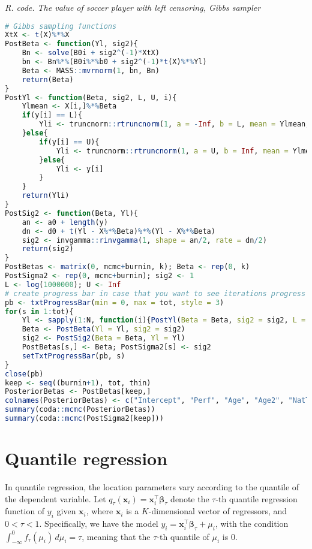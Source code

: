 \begin{tcolorbox}[enhanced,width=4.67in,center upper,
	fontupper=\large\bfseries,drop shadow southwest,sharp corners]
	\textit{R. code. The value of soccer player with left censoring, Gibbs sampler}
	\begin{VF}
		\begin{lstlisting}[language=R]
# Gibbs sampling functions
XtX <- t(X)%*%X
PostBeta <- function(Yl, sig2){
	Bn <- solve(B0i + sig2^(-1)*XtX)
	bn <- Bn%*%(B0i%*%b0 + sig2^(-1)*t(X)%*%Yl)
	Beta <- MASS::mvrnorm(1, bn, Bn)
	return(Beta)
}
PostYl <- function(Beta, sig2, L, U, i){
	Ylmean <- X[i,]%*%Beta
	if(y[i] == L){
		Yli <- truncnorm::rtruncnorm(1, a = -Inf, b = L, mean = Ylmean, sd = sig2^0.5)
	}else{
		if(y[i] == U){
			Yli <- truncnorm::rtruncnorm(1, a = U, b = Inf, mean = Ylmean, sd = sig2^0.5)
		}else{
			Yli <- y[i]
		}
	}
	return(Yli)
}
PostSig2 <- function(Beta, Yl){
	an <- a0 + length(y)
	dn <- d0 + t(Yl - X%*%Beta)%*%(Yl - X%*%Beta)
	sig2 <- invgamma::rinvgamma(1, shape = an/2, rate = dn/2)
	return(sig2)
}
PostBetas <- matrix(0, mcmc+burnin, k); Beta <- rep(0, k)
PostSigma2 <- rep(0, mcmc+burnin); sig2 <- 1
L <- log(1000000); U <- Inf
# create progress bar in case that you want to see iterations progress
pb <- txtProgressBar(min = 0, max = tot, style = 3)
for(s in 1:tot){
	Yl <- sapply(1:N, function(i){PostYl(Beta = Beta, sig2 = sig2, L = L, U = U, i)})
	Beta <- PostBeta(Yl = Yl, sig2 = sig2)
	sig2 <- PostSig2(Beta = Beta, Yl = Yl) 
	PostBetas[s,] <- Beta; PostSigma2[s] <- sig2
	setTxtProgressBar(pb, s)
}
close(pb)
keep <- seq((burnin+1), tot, thin)
PosteriorBetas <- PostBetas[keep,]
colnames(PosteriorBetas) <- c("Intercept", "Perf", "Age", "Age2", "NatTeam", "Goals", "Exp", "Exp2")
summary(coda::mcmc(PosteriorBetas))
summary(coda::mcmc(PostSigma2[keep]))
\end{lstlisting}
	\end{VF}
\end{tcolorbox} 

\section{Quantile regression}\label{sec69}

In quantile regression, the location parameters vary according to the quantile of the dependent variable. Let $q_{\tau}(\bm{x}_i) = \bm{x}_i^{\top} \bm{\beta}_{\tau}$ denote the $\tau$-th quantile regression function of $y_i$ given $\bm{x}_i$, where $\bm x_i$ is a $K$-dimensional vector of regressors, and $0 < \tau < 1$. Specifically, we have the model $y_i = \bm{x}_i^{\top} \bm{\beta}_{\tau} + \mu_i$, with the condition $\int_{-\infty}^{0} f_{\tau}(\mu_i) \, d\mu_i = \tau$, meaning that the $\tau$-th quantile of $\mu_i$ is 0.

